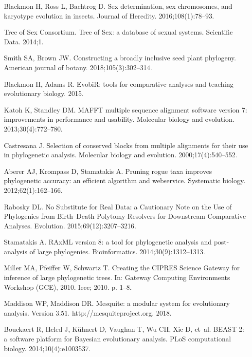 \documentclass[]{rsos}%
\begin{document}
\begin{thebibliography}{9}
Blackmon H, Ross L, Bachtrog D.
 Sex determination, sex chromosomes, and karyotype evolution in
  insects.
 Journal of Heredity. 2016;108(1):78--93.

{Tree of Sex Consortium}.
 Tree of Sex: a database of sexual systems.
 Scientific Data. 2014;1.

Smith SA, Brown JW.
 Constructing a broadly inclusive seed plant phylogeny.
 American journal of botany. 2018;105(3):302--314.

Blackmon H, Adams R. EvobiR: tools for comparative analyses and teaching
  evolutionary biology. 2015.

Katoh K, Standley DM.
 MAFFT multiple sequence alignment software version 7: improvements in
  performance and usability.
 Molecular biology and evolution. 2013;30(4):772--780.

Castresana J.
 Selection of conserved blocks from multiple alignments for their use
  in phylogenetic analysis.
 Molecular biology and evolution. 2000;17(4):540--552.

Aberer AJ, Krompass D, Stamatakis A.
 Pruning rogue taxa improves phylogenetic accuracy: an efficient
  algorithm and webservice.
 Systematic biology. 2012;62(1):162--166.

Rabosky DL.
 No Substitute for Real Data: a Cautionary Note on the Use of
  Phylogenies from Birth--Death Polytomy Resolvers for Downstream Comparative
  Analyses.
 Evolution. 2015;69(12):3207--3216.

Stamatakis A.
 RAxML version 8: a tool for phylogenetic analysis and post-analysis
  of large phylogenies.
 Bioinformatics. 2014;30(9):1312--1313.

Miller MA, Pfeiffer W, Schwartz T.
 Creating the CIPRES Science Gateway for inference of large
  phylogenetic trees.
 In: Gateway Computing Environments Workshop (GCE), 2010. Ieee; 2010.
  p. 1--8.

Maddison WP, Maddison DR.
 Mesquite: a modular system for evolutionary analysis. Version 3.51.
 http://mesquiteproject.org. 2018.

Bouckaert R, Heled J, K{\"u}hnert D, Vaughan T, Wu CH, Xie D, et~al.
 BEAST 2: a software platform for Bayesian evolutionary analysis.
 PLoS computational biology. 2014;10(4):e1003537.


\end{thebibliography}
\end{document}
